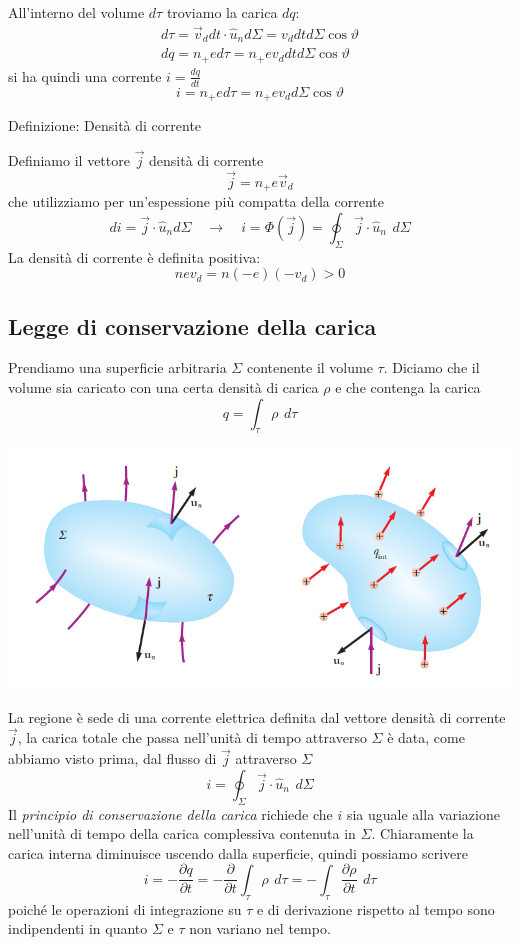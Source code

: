 \documentclass[x11names]{report}
\newcommand{\definizione}[2]{
	\begin{center}
		\fboxsep11pt
		\colorbox{myblue}{\begin{minipage}{5.75in}
				\begin{blues}{Definizione: #1}
					#2
				\end{blues}
		\end{minipage}}
	\end{center}
}
\begin{document}
All'interno del volume \(d\tau\) troviamo la carica \(dq\):
\begin{gather*}
	d\tau = \vec{v}_d dt \cdot \hat{u}_n d\Sigma = v_d dt d\Sigma \cos\vartheta \\
	dq = n_+ e d\tau = n_+ e v_d dt d\Sigma \cos\vartheta
\end{gather*}
si ha quindi una corrente \(i = \frac{dq}{dt}\) 
\[
i =  n_+ e d\tau = n_+ e v_d  d\Sigma \cos\vartheta
\]

\definizione{Densità di corrente}{
Definiamo il vettore \(\vec{j}\) densità di corrente 
\[
\vec{j} = n_+ e \vec{v}_d 
\]
che utilizziamo per un'espessione più compatta della corrente
\[
di = \vec{j}\cdot\hat{u}_n d\Sigma \quad \to \quad i = \Phi(\vec{j}) = \oint_\Sigma  \vec{j} \cdot \hat{u}_n \,\ d\Sigma
\]
La densità di corrente è definita positiva:
\[
n e v_d = n (-e)(-v_d) > 0
\]
}
\subsection{Legge di conservazione della carica}
Prendiamo una superficie arbitraria \(\Sigma\) contenente il volume \(\tau\). Diciamo che il volume sia caricato con una certa densità di carica \(\rho\) e che contenga la carica
\[
q = \int_\tau \rho \,\ d\tau
\]
\begin{center}
	\includegraphics[scale=0.5]{img/cons_carica.png}
\end{center}
La regione è sede di una corrente elettrica definita dal vettore densità di corrente \(\vec{j}\), la carica totale che passa nell'unità di tempo attraverso \(\Sigma\) è data, come abbiamo visto prima, dal flusso di \(\vec{j}\) attraverso \(\Sigma\)
\[
i = \oint_{\Sigma} \vec{j}\cdot \hat{u}_n \,\ d\Sigma
\]
Il \textit{principio di conservazione della carica} richiede che \(i\) sia uguale alla variazione nell'unità di tempo della carica complessiva contenuta in \(\Sigma\). Chiaramente la carica interna diminuisce uscendo dalla superficie, quindi possiamo scrivere
\[
i = - \frac{\partial q}{\partial t} = -\frac{\partial}{\partial t}\int_\tau \rho \,\ d\tau = -\int_\tau \frac{\partial\rho}{\partial t} \,\ d\tau
\]
poiché le operazioni di integrazione su \(\tau\) e di derivazione rispetto al tempo sono indipendenti in quanto \(\Sigma\) e \(\tau\) non variano nel tempo.
\end{document}
